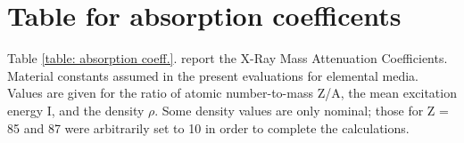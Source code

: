 %
%
\chapter{Table for absorption coefficents}
%
\label{cap:AppendixA}
%
%
Table \ref{table: absorption coeff.}. report the X-Ray Mass Attenuation Coefficients. Material constants assumed in the present evaluations for elemental media. Values are given for the ratio of atomic number-to-mass Z/A, the mean excitation energy I, and the density $\rho $. Some density values are only nominal; those for Z = 85 and 87 were arbitrarily set to 10 in order to complete the calculations.

